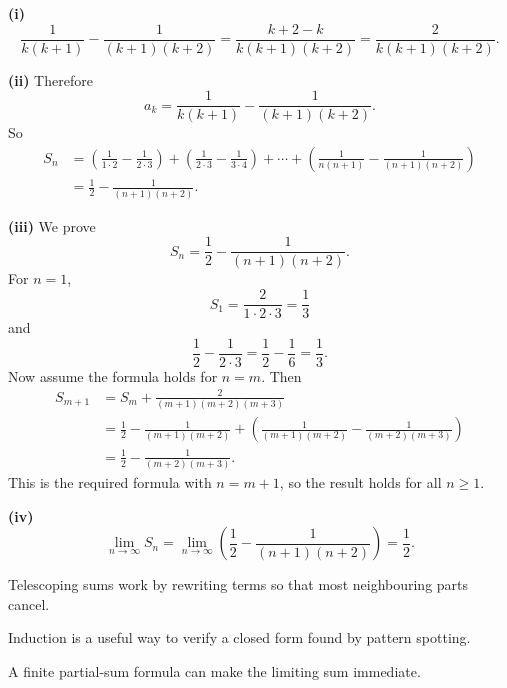 \begin{solution}
\textbf{(i)}
\[
\frac{1}{k(k+1)}-\frac{1}{(k+1)(k+2)}
=\frac{k+2-k}{k(k+1)(k+2)}
=\frac{2}{k(k+1)(k+2)}.
\]

\textbf{(ii)} Therefore
\[
a_k=\frac{1}{k(k+1)}-\frac{1}{(k+1)(k+2)}.
\]
So
\[
\begin{aligned}
S_n
&=\left(\frac1{1\cdot2}-\frac1{2\cdot3}\right)
+\left(\frac1{2\cdot3}-\frac1{3\cdot4}\right)
+\cdots
+\left(\frac1{n(n+1)}-\frac1{(n+1)(n+2)}\right)\\
&=\frac12-\frac{1}{(n+1)(n+2)}.
\end{aligned}
\]

\textbf{(iii)} We prove
\[
S_n=\frac12-\frac{1}{(n+1)(n+2)}.
\]
For $n=1$,
\[
S_1=\frac{2}{1\cdot2\cdot3}=\frac13
\]
and
\[
\frac12-\frac1{2\cdot3}=\frac12-\frac16=\frac13.
\]
Now assume the formula holds for $n=m$. Then
\[
\begin{aligned}
S_{m+1}
&=S_m+\frac{2}{(m+1)(m+2)(m+3)}\\
&=\frac12-\frac1{(m+1)(m+2)}
+\left(\frac1{(m+1)(m+2)}-\frac1{(m+2)(m+3)}\right)\\
&=\frac12-\frac1{(m+2)(m+3)}.
\end{aligned}
\]
This is the required formula with $n=m+1$, so the result holds for all $n\ge1$.

\textbf{(iv)}
\[
\lim_{n\to\infty}S_n
=\lim_{n\to\infty}\left(\frac12-\frac{1}{(n+1)(n+2)}\right)
=\frac12.
\]
\end{solution}
\begin{takeaways}
\item Telescoping sums work by rewriting terms so that most neighbouring parts cancel.
\item Induction is a useful way to verify a closed form found by pattern spotting.
\item A finite partial-sum formula can make the limiting sum immediate.
\end{takeaways}


